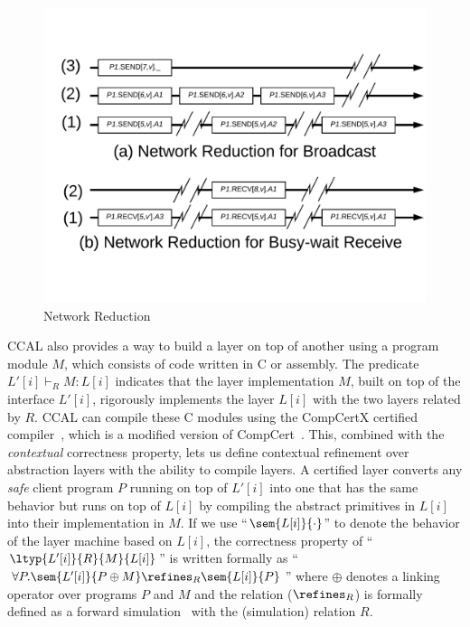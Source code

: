 \begin{figure}
\begin{center}
\includegraphics[scale=0.47]{figs/network_reduction.pdf}
\end{center}
\caption{Network Reduction}
\label{fig:network-reduction}
\end{figure}

CCAL also provides a way to build a layer on top of another using a program module $M$, which consists of code written in C or assembly.
The predicate $L'[i] \vdash_R  M : L[i]$ indicates that the layer implementation $M$, built on top of the interface $L'[i]$, rigorously implements
the layer $L[i]$ with the two layers related by $R$.
CCAL can compile these C modules using the CompCertX certified compiler~\cite{deepspec, concurrency},
which is a modified version of CompCert~\cite{compcert}.
This, combined with the {\em contextual} correctness property,
lets us define contextual refinement over abstraction layers with the ability to compile layers.
A certified layer converts any {\em safe} client program $P$ running on top of $L'[i]$ into one that has the
same behavior but runs on top of $L[i]$ by compiling the abstract
primitives in $L[i]$ into their implementation in $M$.
If we use ``$\sem{L[i]}{\cdot}$'' to denote the behavior of the layer machine based on
$L[i]$, the correctness property of ``$\ltyp{L'[i]}{R}{M}{L[i]}$'' is written
formally as ``$\forall{}P.\sem{L'[i]}{P\oplus{}M} \refines_R \sem{L[i]}{P}$''
where $\oplus$ denotes a linking operator over programs $P$ and $M$ and 
the relation ($\refines_R$) is formally defined as a forward
simulation~\cite{Lynch95,leroy09,Milner71,Park81} with the (simulation) relation $R$.

